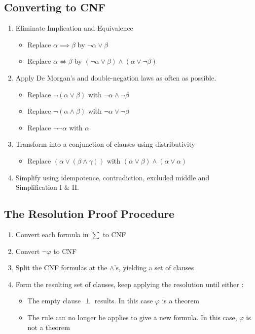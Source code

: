 \documentclass{article}
\begin{document}
\subsection{Converting to CNF}
\begin{enumerate}
\item Eliminate Implication and Equivalence 
\begin{itemize}
\item Replace \(\alpha \implies \beta\) by \(\neg \alpha \vee \beta\)
\item Replace \(\alpha \iff \beta\) by \((\neg \alpha \vee \beta) \wedge (\alpha \vee \neg \beta)\)
\end{itemize}
\item Apply De Morgan’s and double-negation laws as often as
possible.
\begin{itemize}
\item Replace \(\neg (\alpha \vee \beta)\) with \(\neg \alpha \wedge  \neg \beta\)
\item Replace \(\neg (\alpha \wedge \beta)\) with \(\neg \alpha \vee  \neg \beta\)
\item Replace \(\neg \neg \alpha\) with \(\alpha\)
\end{itemize}
\item Transform into a conjunction of clauses using distributivity 
\begin{itemize}
\item Replace \((\alpha \vee (\beta \wedge \gamma))\) with \((\alpha \vee \beta) \wedge (\alpha \vee \alpha)\)
\end{itemize}
\item Simplify using idempotence, contradiction, excluded middle and
Simplification I \& II.
\end{enumerate}

\subsection{The Resolution Proof Procedure}
\begin{enumerate}
\item Convert each formula in \(\sum\) to CNF
\item Convert \(\neg \varphi\) to CNF
\item Split the CNF formulas at the \(\wedge\)'s, yielding a set of clauses 
\item Form the resulting set of clauses, keep applying the resolution until either :
\begin{itemize}
\item The empty clause \(\perp\) results. In this case \(\varphi\) is a theorem 
\item The rule can no longer be applies to give a new formula. In this case, \(\varphi\) is not a theorem 
\end{itemize}
\end{enumerate}
\end{document}
